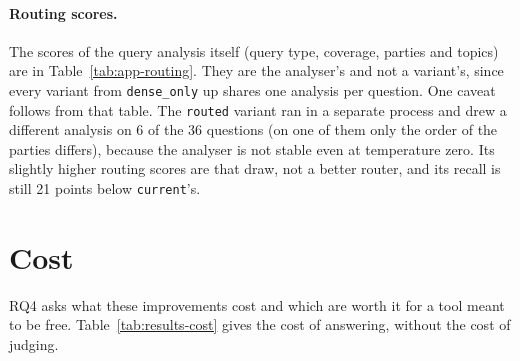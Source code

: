 \paragraph{Routing scores.} The scores of the query analysis itself (query
type, coverage, parties and topics) are in Table~\ref{tab:app-routing}. They
are the analyser's and not a variant's, since every variant from
\texttt{dense\_only} up shares one analysis per question. One caveat follows
from that table. The \texttt{routed} variant ran in a separate process and drew a
different analysis on 6 of the 36 questions (on one of them only the order
of the parties differs), because the analyser is not
stable even at temperature zero. Its slightly higher routing scores are that
draw, not a better router, and its recall is still 21 points below
\texttt{current}'s.

\section{Cost} \label{sec:results-cost}

RQ4 asks what these improvements cost and which are worth it for a tool meant
to be free. Table~\ref{tab:results-cost} gives the cost of answering, without
the cost of judging.

